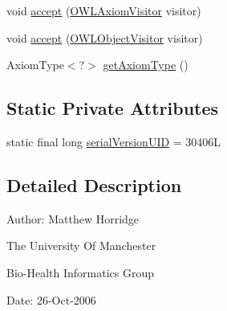 \begin{DoxyCompactItemize}
\item 
void \hyperlink{classuk_1_1ac_1_1manchester_1_1cs_1_1owl_1_1owlapi_1_1_o_w_l_negative_object_property_assertion_axiom_impl_aaf8bbeebbd5320fea04b5bd07afa8430}{accept} (\hyperlink{interfaceorg_1_1semanticweb_1_1owlapi_1_1model_1_1_o_w_l_axiom_visitor}{O\-W\-L\-Axiom\-Visitor} visitor)
\item 
void \hyperlink{classuk_1_1ac_1_1manchester_1_1cs_1_1owl_1_1owlapi_1_1_o_w_l_negative_object_property_assertion_axiom_impl_ae7f50cb695be81a446e18370e26e5431}{accept} (\hyperlink{interfaceorg_1_1semanticweb_1_1owlapi_1_1model_1_1_o_w_l_object_visitor}{O\-W\-L\-Object\-Visitor} visitor)
\item 
Axiom\-Type$<$?$>$ \hyperlink{classuk_1_1ac_1_1manchester_1_1cs_1_1owl_1_1owlapi_1_1_o_w_l_negative_object_property_assertion_axiom_impl_ad4e66c601b67612c9ed07b346b8b963e}{get\-Axiom\-Type} ()
\end{DoxyCompactItemize}
\subsection*{Static Private Attributes}
\begin{DoxyCompactItemize}
\item 
static final long \hyperlink{classuk_1_1ac_1_1manchester_1_1cs_1_1owl_1_1owlapi_1_1_o_w_l_negative_object_property_assertion_axiom_impl_a0ddedd33cbbd04291ca65afaa16389be}{serial\-Version\-U\-I\-D} = 30406\-L
\end{DoxyCompactItemize}


\subsection{Detailed Description}
Author\-: Matthew Horridge\par
 The University Of Manchester\par
 Bio-\/\-Health Informatics Group\par
 Date\-: 26-\/\-Oct-\/2006\par
\par
 

